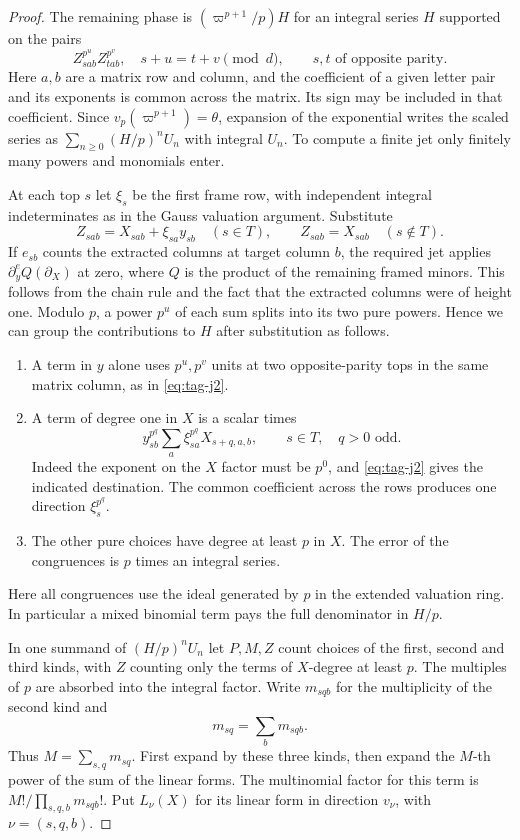 \begin{proof}
The remaining phase is \((\varpi^{p+1}/p)H\) for an integral
series \(H\) supported on the pairs
\[
       Z_{sab}^{p^u} Z_{tab}^{p^v},\quad
        s+u=t+v\pmod d,\qquad s,t\text{ of opposite parity}.
                                                                 \tag{J2}\label{eq:tag-j2}
\]
Here \(a,b\) are a matrix row and column, and the coefficient of a
given letter pair and its exponents is common across the matrix.
Its sign may be included in that coefficient. Since
\(v_p(\varpi^{p+1})=\theta\), expansion of the exponential
writes the scaled series as \(\sum_{n\ge0}(H/p)^n U_n\)
with integral \(U_n\). To compute a finite jet only
finitely many powers and monomials enter.

At each top \(s\) let \(\xi_s\) be the first frame row, with
independent integral indeterminates as in the Gauss valuation
argument. Substitute
\[
  Z_{sab}=X_{sab}+\xi_{sa}y_{sb}\quad(s\in T),\qquad
  Z_{sab}=X_{sab}\quad(s\notin T).
\]
If \(e_{sb}\) counts the extracted columns at target column \(b\),
the required jet applies \(\partial_y^e Q(\partial_X)\)
at zero, where \(Q\) is the product of the remaining framed
minors. This follows from the chain rule and the fact that the
extracted columns were of height one. Modulo \(p\), a power
\(p^u\) of each sum splits into its two pure powers. Hence we
can group the contributions to \(H\) after substitution as follows.
\begin{enumerate}
\item A term in \(y\) alone uses \(p^u,p^v\) units at
two opposite-parity tops in the same matrix column, as in \eqref{eq:tag-j2}.
\item A term of degree one in \(X\) is a scalar times
\[
     y_{sb}^{p^q}\sum_a \xi_{sa}^{p^q}X_{s+q,a,b},
          \qquad s\in T,\quad q>0\text{ odd}.
\]
Indeed the exponent on the \(X\) factor must be \(p^0\), and
\eqref{eq:tag-j2} gives the indicated destination. The common coefficient
across the rows produces one direction \(\xi_s^{p^q}\).
\item The other pure choices have degree at least \(p\) in \(X\).
The error of the congruences is \(p\) times an integral series.
\end{enumerate}
Here all congruences use the ideal generated by \(p\) in the
extended valuation ring. In particular a mixed binomial term
pays the full denominator in \(H/p\).

In one summand of \((H/p)^n U_n\) let \(P,M,Z\) count choices
of the first, second and third kinds, with \(Z\) counting only
the terms of \(X\)-degree at least \(p\). The multiples of \(p\)
are absorbed into the integral factor. Write \(m_{sqb}\) for
the multiplicity of the second kind and 
\[
  m_{sq}=\sum_bm_{sqb}.
\]
Thus \(M=\sum_{s,q}m_{sq}\). First expand by these three kinds,
then expand the \(M\)-th power of the sum of the linear forms.
The multinomial factor for this term is
\(M!/\prod_{s,q,b}m_{sqb}!\). Put \(L_\nu(X)\) for its
linear form in direction \(v_\nu\), with \(\nu=(s,q,b)\).


\end{proof}
